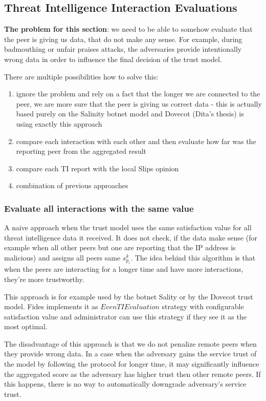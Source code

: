 \subsection{Threat Intelligence Interaction Evaluations}

\textbf{The problem for this section}: we need to be able to somehow evaluate that the peer is giving us data, that do not make any sense. 
For example, during badmouthing or unfair praises attacks, the adversaries provide intentionally wrong data in order to influence the final decision of the trust model.

There are multiple possibilities how to solve this:
\begin{enumerate}
\item ignore the problem and rely on a fact that the longer we are connected to the peer, we are more sure that the peer is giving us correct data - this is actually based purely on the Salinity botnet model and Dovecot (Dita's thesis) is using exactly this approach
\item compare each interaction with each other and then evaluate how far was the reporting peer from the aggregated result
\item compare each TI report with the local Slips opinion 
\item combination of previous approaches
\end{enumerate}


\subsubsection{Evaluate all interactions with the same value}
A naive approach when the trust model uses the same satisfaction value for all threat intelligence data it received. It does not check, if the data make sense (for example when all other peers but one are reporting that the IP address is malicious) and assigns all peers same $s^{k}_{p_i}$. The idea behind this algorithm is that when the peers are interacting for a longer time and have more interactions, they're more trustworthy.

This approach is for example used by the botnet Sality or by the Dovecot trust model. Fides implements it as $EvenTIEvaluation$ strategy with configurable satisfaction value and administrator can use this strategy if they see it as the most optimal.

The disadvantage of this approach is that we do not penalize remote peers when they provide wrong data. In a case when the adversary gains the service trust of the model by following the protocol for longer time, it may significantly influence the aggregated score as the adversary has higher trust then other remote peers. If this happens, there is no way to automatically downgrade adversary's service trust.

